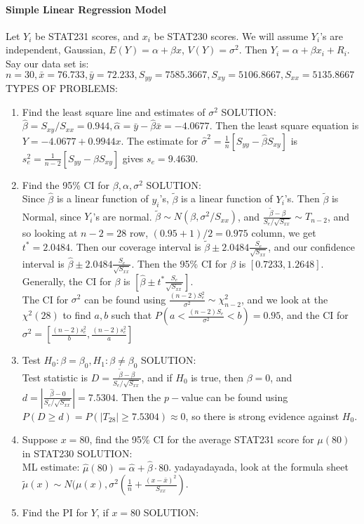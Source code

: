 \documentclass[10pt,letter]{article}
\theoremstyle{plain}
\theoremstyle{definition}
\begin{document}
\paragraph{Simple Linear Regression Model}
Let $Y_i$ be STAT231 scores, and $x_i$ be STAT230 scores. We will assume $Y_i$'s are independent, Gaussian, $E(Y)=\alpha+\beta x$, $V(Y)=\sigma^2$. Then $Y_i=\alpha+\beta x_i+R_i$. Say our data set is: $n=30,\bar{x}=76.733,\bar{y}=72.233,S_{yy}=7585.3667,S_{xy}=5106.8667,S_{xx}=5135.8667$ \\ 
TYPES OF PROBLEMS:
\begin{enumerate}
    \item Find the least square line and estimates of $\sigma^2$ 
    SOLUTION:\\ 
    $\hat\beta=S_{xy}/S_{xx}=0.944,\hat\alpha=\bar{y}-\hat\beta\bar{x}=-4.0677$. Then the least square equation is $Y=-4.0677+0.9944x$. The estimate for $\hat\sigma^2=\frac{1}{n}[S_{yy}-\hat\beta S_{xy}]$ is $s_e^2=\frac{1}{n-2}[S_{yy}-\hat\beta S_{xy}]$ gives $s_e=9.4630$. 
    \item Find the 95\% CI for $\beta,\alpha,\sigma^2$ 
    SOLUTION:\\ 
    Since $\hat\beta$ is a linear function of $y_i$'s, $\tilde\beta$ is a linear function of $Y_i$'s. Then $\tilde\beta$ is Normal, since $Y_i$'s are normal. $\tilde\beta\sim N(\beta,\sigma^2/S_{xx})$, and $\frac{\tilde\beta-\beta}{S_e/\sqrt{S_{xx}}}\sim T_{n-2}$, and so looking at $n-2=28$ row, $(0.95+1)/2=0.975$ column, we get $t^*=2.0484$. Then our coverage interval is $\tilde\beta\pm2.0484\frac{S_e}{\sqrt{S_{xx}}}$, and our confidence interval is $\hat\beta\pm2.0484\frac{S_e}{\sqrt{S_{xx}}}$. Then the 95\% CI for $\beta$ is $[0.7233,1.2648]$. Generally, the CI for $\beta$ is $[\hat{\beta}\pm t^*\frac{S_e}{\sqrt{S_{xx}}}]$. \\ 
    The CI for $\sigma^2$ can be found using $\frac{(n-2)S_e^2}{\sigma^2}\sim\chi^2_{n-2}$, and we look at the $\chi^2(28)$ to find $a,b$ such that $P(a<\frac{(n-2)S_e}{\sigma^2}<b)=0.95$, and the CI for $\sigma^2=\left[\frac{(n-2)s_e^2}{b},\frac{(n-2)s_e^2}{a}\right]$
    \item Test $H_0:\beta=\beta_0,H_1:\beta\neq\beta_0$ 
    SOLUTION:\\ 
    Test statistic is $D=\frac{\tilde\beta-\beta}{S_e/\sqrt{S_{xx}}}$, and if $H_0$ is true, then $\beta=0$, and $d=\left|\frac{\hat\beta-0}{S_e/\sqrt{S_{xx}}}\right|=7.5304$. Then the $p-$value can be found using $P(D\geq d)=P(|T_{28}|\geq7.5304)\approx0$, so there is strong evidence against $H_0$. 
    \item Suppose $x=80$, find the 95\% CI for the average STAT231 score for $\mu(80)$ in STAT230
    SOLUTION:\\ 
    ML estimate: $\hat\mu(80)=\hat\alpha+\hat\beta\cdot80$. yadayadayada, look at the formula sheet $\tilde\mu(x)\sim N(\mu(x),\sigma^2\left(\frac{1}{n}+\frac{(x-\bar{x})^2}{S_{xx}}\right)$.
    \item Find the PI for $Y$, if $x=80$ 
    SOLUTION:\\ 
    

\end{enumerate}
\end{document}
